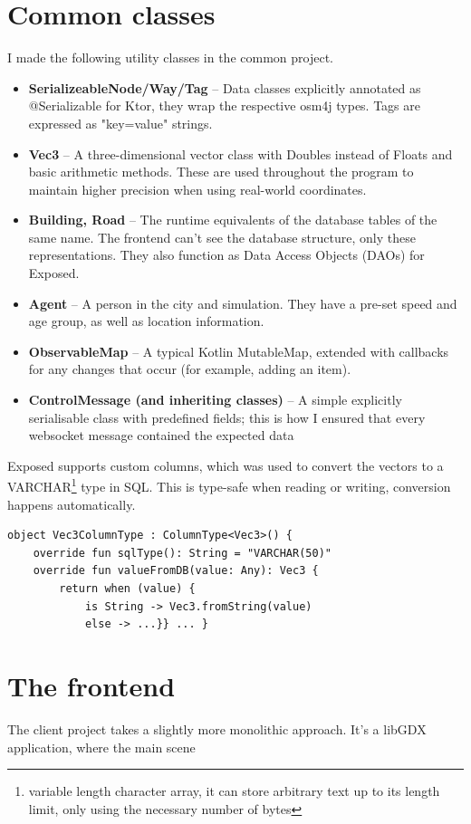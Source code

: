 \section{Common classes}

I made the following utility classes in the common project. \begin{itemize}
    \item \textbf{SerializeableNode/Way/Tag} -- Data classes explicitly annotated as @Serializable for Ktor, they wrap the respective osm4j types. Tags are expressed as "key=value" strings.
    \item \textbf{Vec3} -- A three-dimensional vector class with Doubles instead of Floats and basic arithmetic methods. These are used throughout the program to maintain higher precision when using real-world coordinates.
    \item \textbf{Building, Road} -- The runtime equivalents of the database tables of the same name. The frontend can't see the database structure, only these representations. They also function as Data Access Objects (DAOs) for Exposed.
    \item \textbf{Agent} -- A person in the city and simulation. They have a pre-set speed and age group, as well as location information.
    \item \textbf{ObservableMap} -- A typical Kotlin MutableMap, extended with callbacks for any changes that occur (for example, adding an item).
    \item \textbf{ControlMessage (and inheriting classes)} -- A simple explicitly serialisable class with predefined fields; this is how I ensured that every websocket message contained the expected data
\end{itemize}

\label{serialise}
Exposed supports custom columns, which was used to convert the vectors to a VARCHAR\footnote{variable length character array, it can store arbitrary text up to its length limit, only using the necessary number of bytes} type in SQL. This is type-safe when reading or writing, conversion happens automatically.
\begin{lstlisting}[caption=Custom column type in JetBrains Exposed]
    object Vec3ColumnType : ColumnType<Vec3>() {
    override fun sqlType(): String = "VARCHAR(50)"
    override fun valueFromDB(value: Any): Vec3 {
        return when (value) {
            is String -> Vec3.fromString(value)
            else -> ...}} ... }
\end{lstlisting}

\section{The frontend}
The client project takes a slightly more monolithic approach. It's a libGDX application, where the main scene 


